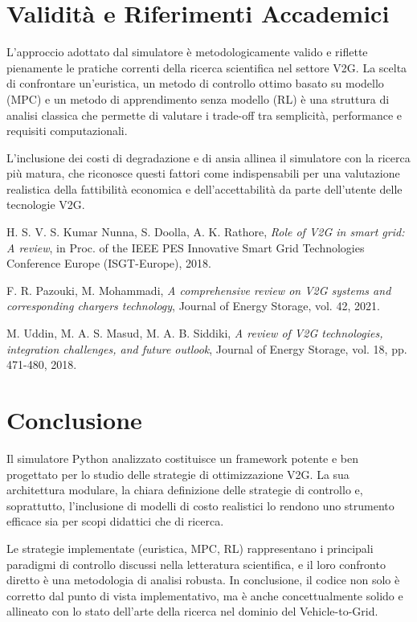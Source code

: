 \documentclass[a4paper, 11pt]{article}
\begin{document}
\section{Validità e Riferimenti Accademici}
L'approccio adottato dal simulatore è metodologicamente valido e riflette pienamente le pratiche correnti della ricerca scientifica nel settore V2G. La scelta di confrontare un'euristica, un metodo di controllo ottimo basato su modello (MPC) e un metodo di apprendimento senza modello (RL) è una struttura di analisi classica che permette di valutare i trade-off tra semplicità, performance e requisiti computazionali.

L'inclusione dei costi di degradazione e di ansia allinea il simulatore con la ricerca più matura, che riconosce questi fattori come indispensabili per una valutazione realistica della fattibilità economica e dell'accettabilità da parte dell'utente delle tecnologie V2G.

\begin{thebibliography}{9}

H. S. V. S. Kumar Nunna, S. Doolla, A. K. Rathore,
\textit{Role of V2G in smart grid: A review},
in Proc. of the IEEE PES Innovative Smart Grid Technologies Conference Europe (ISGT-Europe), 2018.

F. R. Pazouki, M. Mohammadi,
\textit{A comprehensive review on V2G systems and corresponding chargers technology},
Journal of Energy Storage, vol. 42, 2021.

M. Uddin, M. A. S. Masud, M. A. B. Siddiki,
\textit{A review of V2G technologies, integration challenges, and future outlook},
Journal of Energy Storage, vol. 18, pp. 471-480, 2018.

\end{thebibliography}

\section{Conclusione}
Il simulatore Python analizzato costituisce un framework potente e ben progettato per lo studio delle strategie di ottimizzazione V2G. La sua architettura modulare, la chiara definizione delle strategie di controllo e, soprattutto, l'inclusione di modelli di costo realistici lo rendono uno strumento efficace sia per scopi didattici che di ricerca.

Le strategie implementate (euristica, MPC, RL) rappresentano i principali paradigmi di controllo discussi nella letteratura scientifica, e il loro confronto diretto è una metodologia di analisi robusta. In conclusione, il codice non solo è corretto dal punto di vista implementativo, ma è anche concettualmente solido e allineato con lo stato dell'arte della ricerca nel dominio del Vehicle-to-Grid.
\end{document}
